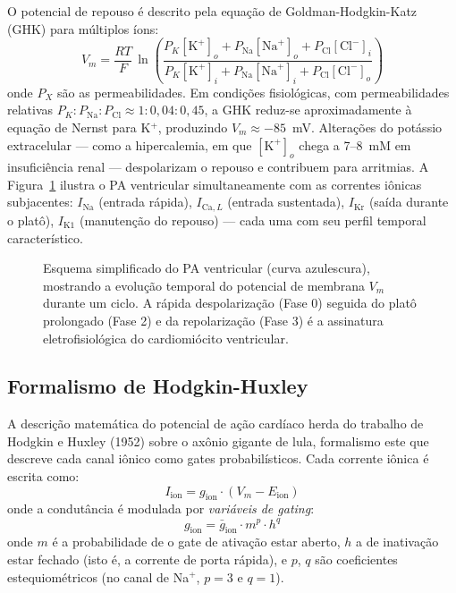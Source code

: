 O potencial de repouso é descrito pela equação de Goldman-Hodgkin-Katz
(GHK) para múltiplos íons:
\begin{equation}
V_m = \frac{RT}{F}\, \ln \!
\left(\frac{P_K[\mathrm{K}^+]_o + P_{\mathrm{Na}}[\mathrm{Na}^+]_o
                + P_{\mathrm{Cl}}[\mathrm{Cl}^-]_i}
            {P_K[\mathrm{K}^+]_i + P_{\mathrm{Na}}[\mathrm{Na}^+]_i
                + P_{\mathrm{Cl}}[\mathrm{Cl}^-]_o}\right)
\end{equation}
onde $P_X$ são as permeabilidades. Em condições fisiológicas, com
permeabilidades relativas $P_K : P_{\mathrm{Na}} : P_{\mathrm{Cl}}
\approx 1 : 0{,}04 : 0{,}45$, a GHK reduz-se aproximadamente à
equação de Nernst para K$^+$, produzindo $V_m \approx -85$~mV. Alterações
do potássio extracelular --- como a hipercalemia, em que $[\mathrm{K}^+]_o$
chega a 7--8~mM em insuficiência renal --- despolarizam o repouso e
contribuem para arritmias. A Figura~\ref{fig:12-pa-correntes} ilustra o
PA ventricular simultaneamente com as correntes iônicas subjacentes:
$I_{\mathrm{Na}}$ (entrada rápida), $I_{\mathrm{Ca},L}$ (entrada
sustentada), $I_{\mathrm{Kr}}$ (saída durante o platô), $I_{\mathrm{K1}}$
(manutenção do repouso) --- cada uma com seu perfil temporal
característico.

\begin{figure}[htbp]
\centering
{}
\caption{Esquema simplificado do PA ventricular (curva azulescura), mostrando a evolução temporal do potencial de membrana $V_m$ durante um ciclo. A rápida despolarização (Fase 0) seguida do platô prolongado (Fase 2) e da repolarização (Fase 3) é a assinatura eletrofisiológica do cardiomiócito ventricular.}
\label{fig:12-pa-correntes}
\end{figure}

\subsection{Formalismo de Hodgkin-Huxley}
\label{sub:image12-hh}

A descrição matemática do potencial de ação cardíaco herda do trabalho de
Hodgkin e Huxley (1952) sobre o axônio gigante de lula, formalismo este
que descreve cada canal iônico como gates probabilísticos. Cada corrente
iônica é escrita como:
\begin{equation}
I_{\mathrm{ion}} = g_{\mathrm{ion}} \cdot (V_m - E_{\mathrm{ion}})
\end{equation}
onde a condutância é modulada por \emph{variáveis de gating}:
\begin{equation}
g_{\mathrm{ion}} = \bar{g}_{\mathrm{ion}} \cdot m^p \cdot h^q
\end{equation}
onde $m$ é a probabilidade de o gate de ativação estar aberto, $h$ a de
inativação estar fechado (isto é, a corrente de porta rápida), e
$p$, $q$ são coeficientes estequiométricos (no canal de Na$^+$,
$p = 3$ e $q = 1$).

